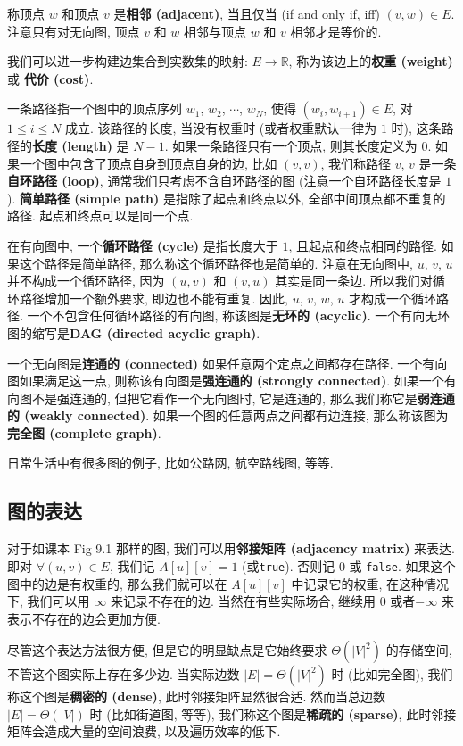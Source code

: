 \documentclass[a4paper]{ctexart}
\theoremstyle{definition}
\theoremstyle{definition}
\begin{document}
称顶点 $w$ 和顶点 $v$ 是{\bf 相邻 (adjacent)}, 当且仅当 (if and only if, iff)
$(v, w) \in E$. 注意只有对无向图, 顶点 $v$ 和 $w$ 相邻与顶点 $w$ 和 $v$ 相邻才是等价的.

我们可以进一步构建边集合到实数集的映射: $E \to \mathbb{R}$, 称为该边上的{\bf 权重 (weight)}
或 {\bf 代价 (cost)}. 

 一条路径指一个图中的顶点序列 $w_1$, $w_2$, $\cdots$,
$w_N$, 使得 $(w_i, w_{i + 1}) \in E$, 对 $1 \leq i \leq N$ 成立.
该路径的长度, 当没有权重时 (或者权重默认一律为 $1$ 时), 这条路径的{\bf 长度 (length)}
是 $N - 1$. 如果一条路径只有一个顶点, 则其长度定义为 $0$.
如果一个图中包含了顶点自身到顶点自身的边, 比如 $(v, v)$,
我们称路径 $v$, $v$ 是一条{\bf 自环路径 (loop)},
通常我们只考虑不含自环路径的图 (注意一个自环路径长度是 $1$). {\bf 简单路径 (simple path)}
是指除了起点和终点以外, 全部中间顶点都不重复的路径. 起点和终点可以是同一个点.

在有向图中, 一个{\bf 循环路径 (cycle)} 是指长度大于 $1$, 且起点和终点相同的路径.
如果这个路径是简单路径, 那么称这个循环路径也是简单的. 注意在无向图中, $u$, $v$, $u$
并不构成一个循环路径, 因为 $(u, v)$ 和 $(v, u)$ 其实是同一条边.
所以我们对循环路径增加一个额外要求, 即边也不能有重复. 因此, $u$, $v$, $w$, $u$
才构成一个循环路径. 一个不包含任何循环路径的有向图,
称该图是{\bf 无环的 (acyclic)}. 一个有向无环图的缩写是{\bf DAG (directed acyclic graph)}.

一个无向图是{\bf 连通的 (connected)} 如果任意两个定点之间都存在路径.
一个有向图如果满足这一点, 则称该有向图是{\bf 强连通的 (strongly connected)}.
如果一个有向图不是强连通的, 但把它看作一个无向图时, 它是连通的,
那么我们称它是{\bf 弱连通的 (weakly connected)}. 如果一个图的任意两点之间都有边连接,
那么称该图为{\bf 完全图 (complete graph)}.

日常生活中有很多图的例子, 比如公路网, 航空路线图, 等等.

\subsection{图的表达}
对于如课本 Fig 9.1 那样的图, 我们可以用{\bf 邻接矩阵 (adjacency matrix)} 来表达.
即对 $\forall (u, v) \in E$, 我们记 $A[u][v] = 1$ (或\verb|true|).
否则记 $0$ 或 \verb|false|. 如果这个图中的边是有权重的, 那么我们就可以在
$A[u][v]$ 中记录它的权重, 在这种情况下, 我们可以用 $\infty$ 来记录不存在的边.
当然在有些实际场合, 继续用 $0$ 或者$-\infty$ 来表示不存在的边会更加方便. 

尽管这个表达方法很方便, 但是它的明显缺点是它始终要求 $\Theta(|V|^2)$ 的存储空间,
不管这个图实际上存在多少边. 当实际边数 $|E| = \Theta(|V|^2)$ 时 (比如完全图),
我们称这个图是{\bf 稠密的 (dense)}, 此时邻接矩阵显然很合适.
然而当总边数 $|E| = \Theta(|V|)$ 时 (比如街道图, 等等),
我们称这个图是{\bf 稀疏的 (sparse)}, 此时邻接矩阵会造成大量的空间浪费,
以及遍历效率的低下. 
\end{document}
